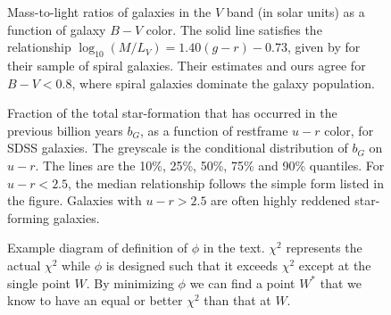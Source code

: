 \clearpage
{}
\begin{figure}
\figurenum{\fignum}
\caption{\label{mtol} Mass-to-light ratios of galaxies in the $V$ band
	(in solar units) as a function of galaxy $B-V$ color. The solid line
	satisfies the relationship $\log_{10}(M/L_V) = 1.40 (g-r) - 0.73$,
	given by \citet{bell01b} for their sample of spiral galaxies. 
	Their estimates and ours agree for $B-V < 0.8$, where spiral
	galaxies dominate the galaxy population.}
\end{figure}

\clearpage
{}
\begin{figure}
\figurenum{\fignum}
\caption{\label{umr_bg} Fraction of the total star-formation that has
	occurred in the previous billion years $b_G$, as a function of restframe
	$u-r$ color, for SDSS galaxies. The greyscale is the conditional
	distribution of $b_G$ on $u-r$. The lines are the 10\%, 25\%, 50\%,
	75\% and 90\% quantiles. For $u-r < 2.5$, the median relationship
	follows the simple form listed in the figure. Galaxies with $u-r >
	2.5$ are often highly reddened star-forming galaxies.}
\end{figure}

\clearpage
{}
\begin{figure}
\figurenum{\fignum}
\caption{\label{lemma} Example diagram of definition of $\phi$ in the
	text. $\chi^2$ represents the actual $\chi^2$ while $\phi$ is
	designed such that it exceeds $\chi^2$ except at the single point
	$W$. By minimizing $\phi$ we can find a point $W^\ast$ that we know
	to have an equal or better $\chi^2$ than that at $W$. }
\end{figure}
